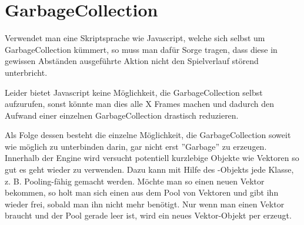 \chapter{GarbageCollection}

Verwendet man eine Skriptsprache wie Javascript, welche sich selbst um GarbageCollection kümmert, so muss man dafür Sorge tragen, dass diese in gewissen Abständen ausgeführte Aktion nicht den Spielverlauf störend unterbricht.

Leider bietet Javascript keine Möglichkeit, die GarbageCollection selbst aufzurufen, sonst könnte man dies alle X Frames machen und dadurch den Aufwand einer einzelnen GarbageCollection drastisch reduzieren.

Als Folge dessen besteht die einzelne Möglichkeit, die GarbageCollection soweit wie möglich zu unterbinden darin, gar nicht erst ''Garbage'' zu erzeugen. Innerhalb der Engine wird versucht potentiell kurzlebige Objekte wie Vektoren so gut es geht wieder zu verwenden. Dazu kann mit Hilfe des -Objekts jede Klasse, z. B.  Pooling-fähig gemacht werden. Möchte man so einen neuen Vektor bekommen, so holt man sich einen aus dem Pool von Vektoren und gibt ihn wieder frei, sobald man ihn nicht mehr benötigt. Nur wenn man einen Vektor braucht und der Pool gerade leer ist, wird ein neues Vektor-Objekt per  erzeugt.

